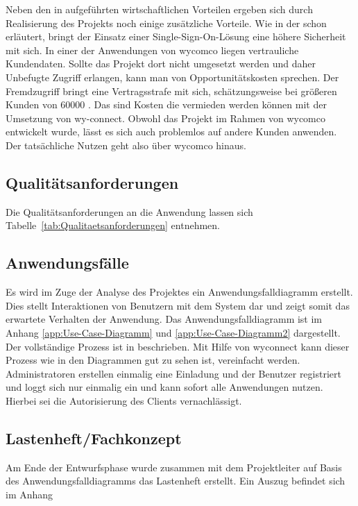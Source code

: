 Neben den in  aufgeführten wirtschaftlichen Vorteilen ergeben sich durch Realisierung des Projekts noch einige zusätzliche Vorteile.
Wie in der  schon erläutert, bringt der Einsatz einer Single-Sign-On-Lösung eine höhere Sicherheit mit sich. In einer der Anwendungen von wycomco liegen vertrauliche Kundendaten. Sollte das Projekt dort nicht umgesetzt werden und daher Unbefugte Zugriff erlangen, kann man von Opportunitätskosten sprechen. Der Fremdzugriff bringt eine Vertragsstrafe mit sich, schätzungsweise bei größeren Kunden von 60000 \eur. Das sind Kosten die vermieden werden können mit der Umsetzung von wy-connect. 
Obwohl das Projekt im Rahmen von wycomco entwickelt wurde, lässt es sich auch problemlos auf andere Kunden anwenden. Der tatsächliche Nutzen geht also über wycomco hinaus.

\subsection{Qualitätsanforderungen}
\label{sec:Qualitaetsanforderungen}

Die Qualitätsanforderungen an die Anwendung lassen sich Tabelle~\ref{tab:Qualitaetsanforderungen} entnehmen.


\subsection{Anwendungsfälle}
\label{sec:Anwendungsfaelle}

Es wird im Zuge der Analyse des Projektes ein Anwendungsfalldiagramm erstellt. Dies stellt
Interaktionen von Benutzern mit dem System dar und zeigt somit das erwartete Verhalten der
Anwendung. Das Anwendungsfalldiagramm ist im Anhang \ref{app:Use-Case-Diagramm} und \ref{app:Use-Case-Diagramm2} dargestellt.
Der vollständige Prozess ist in  beschrieben.
Mit Hilfe von wyconnect kann dieser Prozess wie in den Diagrammen gut zu sehen ist, vereinfacht werden. Administratoren erstellen einmalig eine Einladung und der Benutzer registriert und loggt sich nur einmalig ein und kann sofort alle Anwendungen nutzen. Hierbei sei die Autorisierung des Clients vernachlässigt. 

\subsection{Lastenheft/Fachkonzept}
Am Ende der Entwurfsphase wurde zusammen mit dem Projektleiter auf Basis des Anwendungsfalldiagramms das Lastenheft erstellt. Ein Auszug befindet sich im Anhang 

